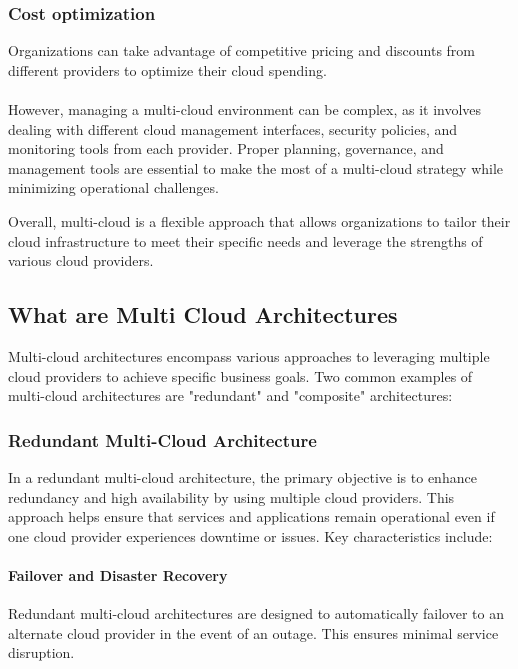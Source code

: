 \subsubsection{Cost optimization}
Organizations can take advantage of competitive pricing and 
discounts from different providers to optimize their cloud spending.\\
\\

However, managing a multi-cloud environment can be complex, as it involves dealing with different cloud management
interfaces, security policies, and monitoring tools from each provider. Proper planning, governance, and management tools are 
essential to make the most of a multi-cloud strategy while minimizing operational challenges.

Overall, multi-cloud is a flexible approach that allows organizations to tailor their cloud infrastructure to meet 
their specific needs and leverage the strengths of various cloud providers.

\subsection{What are Multi Cloud Architectures}


Multi-cloud architectures encompass various approaches to leveraging multiple cloud providers to achieve specific business goals. 
Two common examples of multi-cloud architectures are "redundant" and "composite" architectures:

\subsubsection{Redundant Multi-Cloud Architecture}

In a redundant multi-cloud architecture, the primary objective is to enhance redundancy and high availability by using multiple cloud providers. 
This approach helps ensure that services and applications remain operational even if one cloud provider experiences downtime or issues. 
Key characteristics include:

\paragraph{Failover and Disaster Recovery}
Redundant multi-cloud architectures are designed to automatically failover to an alternate cloud provider in the event of an outage. 
This ensures minimal service disruption.


